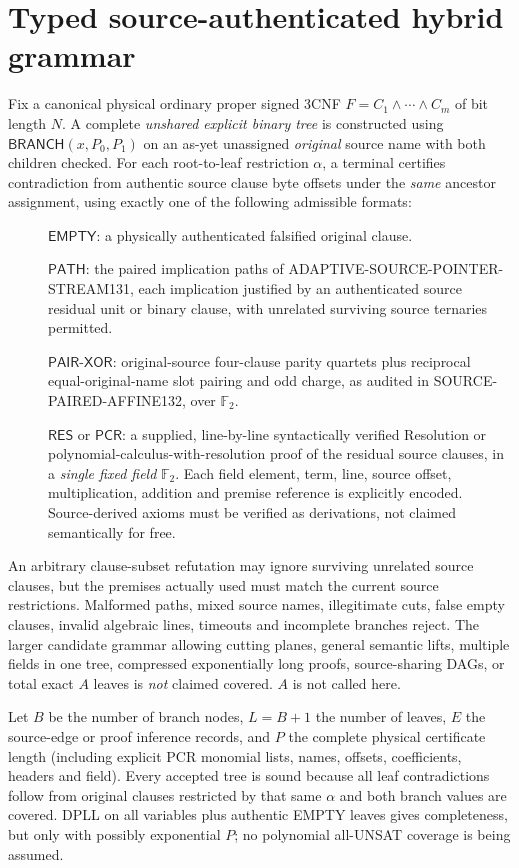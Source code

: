 \documentclass[11pt]{article}
\begin{document}
\section{Typed source-authenticated hybrid grammar}
Fix a canonical physical ordinary proper signed 3CNF $F=C_1\wedge\cdots\wedge C_m$ of bit length $N$. A complete \emph{unshared explicit binary tree} is constructed using $\mathsf{BRANCH}(x,P_0,P_1)$ on an as-yet unassigned \emph{original} source name with both children checked. For each root-to-leaf restriction $\alpha$, a terminal certifies contradiction from authentic source clause byte offsets under the \emph{same} ancestor assignment, using exactly one of the following admissible formats:
\begin{description}
\item[] $\mathsf{EMPTY}$: a physically authenticated falsified original clause.
\item[] $\mathsf{PATH}$: the paired implication paths of ADAPTIVE-SOURCE-POINTER-STREAM131, each implication justified by an authenticated source residual unit or binary clause, with unrelated surviving source ternaries permitted.
\item[] $\mathsf{PAIR\mbox{-}XOR}$: original-source four-clause parity quartets plus reciprocal equal-original-name slot pairing and odd charge, as audited in SOURCE-PAIRED-AFFINE132, over $\mathbb F_2$.
\item[] $\mathsf{RES}$ or $\mathsf{PCR}$: a supplied, line-by-line syntactically verified Resolution or polynomial-calculus-with-resolution proof of the residual source clauses, in a \emph{single fixed field} $\mathbb F_2$. Each field element, term, line, source offset, multiplication, addition and premise reference is explicitly encoded. Source-derived axioms must be verified as derivations, not claimed semantically for free.
\end{description}
An arbitrary clause-subset refutation may ignore surviving unrelated source clauses, but the premises actually used must match the current source restrictions. Malformed paths, mixed source names, illegitimate cuts, false empty clauses, invalid algebraic lines, timeouts and incomplete branches reject. The larger candidate grammar allowing cutting planes, general semantic lifts, multiple fields in one tree, compressed exponentially long proofs, source-sharing DAGs, or total exact $A$ leaves is \emph{not} claimed covered. $A$ is not called here.

Let $B$ be the number of branch nodes, $L=B+1$ the number of leaves, $E$ the source-edge or proof inference records, and $P$ the complete physical certificate length (including explicit PCR monomial lists, names, offsets, coefficients, headers and field). Every accepted tree is sound because all leaf contradictions follow from original clauses restricted by that same $\alpha$ and both branch values are covered. DPLL on all variables plus authentic EMPTY leaves gives completeness, but only with possibly exponential $P$; no polynomial all-UNSAT coverage is being assumed.
\end{document}
